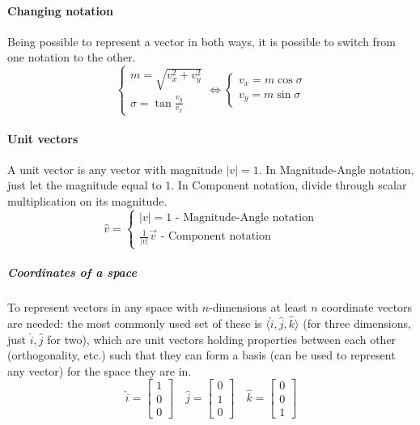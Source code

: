 \paragraph{Changing notation} Being possible to represent a vector in both ways, it is possible to switch from one notation to the other.
\begin{equation}
    \begin{cases}
        m = \sqrt{v_x^2 +v_y^2}\\
        \sigma = \tan\frac{v_y}{v_x}
    \end{cases}
    \iff
    \begin{cases}
        v_x = m \cos \sigma\\
        v_y = m \sin \sigma
    \end{cases}
\end{equation}
\paragraph{Unit vectors} A unit vector is any vector with magnitude $|v|=1$. In Magnitude-Angle notation, just let the magnitude equal to $1$. In Component notation, divide through scalar multiplication on its magnitude.
\begin{equation}
    \hat{v} = \begin{cases}
        |v| = 1 \mbox{ - Magnitude-Angle notation}\\
        \frac{1}{|v|} \vec{v} \mbox{ - Component notation}
    \end{cases}
\end{equation}
\subparagraph{Coordinates of a space} To represent vectors in any space with $n$-dimensions at least $n$ coordinate vectors are needed: the most commonly used set of these is $\langle \hat{i}, \hat{j}, \hat{k}\rangle$ (for three dimensions, just $\hat{i}, \hat{j}$ for two), which are unit vectors holding properties between each other (orthogonality, etc.) such that they can form a basis (can be used to represent any vector) for the space they are in.
\begin{equation}
    \hat{i} =\begin{bmatrix}1\\0\\0\end{bmatrix} \quad
    \hat{j} =\begin{bmatrix}0\\1\\0\end{bmatrix} \quad
    \hat{k} =\begin{bmatrix}0\\0\\1\end{bmatrix}
\end{equation}
